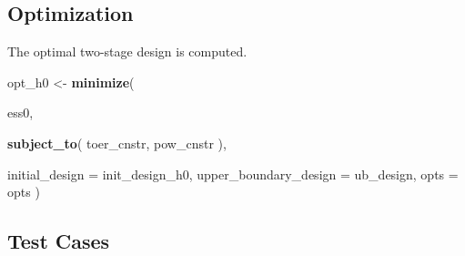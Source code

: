 \documentclass[]{book}
\newenvironment{Shaded}{\begin{snugshade}}{\end{snugshade}}
\newcommand{\DataTypeTok}[1]{\textcolor[rgb]{0.13,0.29,0.53}{#1}}
\newcommand{\DecValTok}[1]{\textcolor[rgb]{0.00,0.00,0.81}{#1}}
\newcommand{\FloatTok}[1]{\textcolor[rgb]{0.00,0.00,0.81}{#1}}
\newcommand{\KeywordTok}[1]{\textcolor[rgb]{0.13,0.29,0.53}{\textbf{#1}}}
\newcommand{\NormalTok}[1]{#1}
\newcommand{\OperatorTok}[1]{\textcolor[rgb]{0.81,0.36,0.00}{\textbf{#1}}}
\newcommand{\StringTok}[1]{\textcolor[rgb]{0.31,0.60,0.02}{#1}}
\begin{document}
\begin{Shaded}
\end{Shaded}

\hypertarget{optimization-1}{%
\subsection{Optimization}\label{optimization-1}}

The optimal two-stage design is computed.

\begin{Shaded}
\begin{Highlighting}[]
\NormalTok{opt_h0 <-}\StringTok{ }\KeywordTok{minimize}\NormalTok{(}
  
\NormalTok{    ess0,}
    
    \KeywordTok{subject_to}\NormalTok{(}
\NormalTok{        toer_cnstr,}
\NormalTok{        pow_cnstr}
\NormalTok{    ),}
    
    \DataTypeTok{initial_design        =}\NormalTok{ init_design_h0,}
    \DataTypeTok{upper_boundary_design =}\NormalTok{ ub_design,}
    \DataTypeTok{opts =}\NormalTok{ opts )}
\end{Highlighting}
\end{Shaded}

\hypertarget{test-cases-1}{%
\subsection{Test Cases}\label{test-cases-1}}
\end{document}
